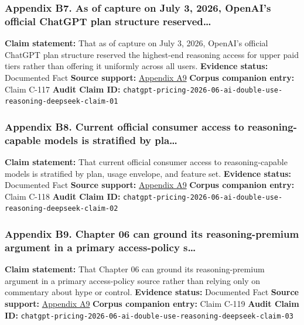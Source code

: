 \documentclass[
  american,
  11pt,
  letterpaper,
]{article}
\begin{document}
\subsubsection{Appendix B7. As of capture on July 3, 2026, OpenAI's
official ChatGPT plan structure
reserved\ldots{}}\label{appendix-b7-as-of-capture-on-july-3-2026-openai-s-official-chatgpt-plan-structure-reserved}

\textbf{Claim statement:} That as of capture on July 3, 2026, OpenAI's
official ChatGPT plan structure reserved the highest-end reasoning
access for upper paid tiers rather than offering it uniformly across all
users. \textbf{Evidence status:} Documented Fact \textbf{Source
support:}
\hyperref[appendix-a9-chatgpt-plans-free-go-plus-pro-business-and-enterprise]{Appendix
A9} \textbf{Corpus companion entry:} Claim C-117 \textbf{Audit Claim
ID:}
\texttt{chatgpt-pricing-2026-06-ai-double-use-reasoning-deepseek-claim-01}

\subsubsection{Appendix B8. Current official consumer access to
reasoning-capable models is stratified by
pla\ldots{}}\label{appendix-b8-current-official-consumer-access-to-reasoning-capable-models-is-stratified-by-pla}

\textbf{Claim statement:} That current official consumer access to
reasoning-capable models is stratified by plan, usage envelope, and
feature set. \textbf{Evidence status:} Documented Fact \textbf{Source
support:}
\hyperref[appendix-a9-chatgpt-plans-free-go-plus-pro-business-and-enterprise]{Appendix
A9} \textbf{Corpus companion entry:} Claim C-118 \textbf{Audit Claim
ID:}
\texttt{chatgpt-pricing-2026-06-ai-double-use-reasoning-deepseek-claim-02}

\subsubsection{Appendix B9. Chapter 06 can ground its reasoning-premium
argument in a primary access-policy
s\ldots{}}\label{appendix-b9-chapter-06-can-ground-its-reasoning-premium-argument-in-a-primary-access-policy-s}

\textbf{Claim statement:} That Chapter 06 can ground its
reasoning-premium argument in a primary access-policy source rather than
relying only on commentary about hype or control. \textbf{Evidence
status:} Documented Fact \textbf{Source support:}
\hyperref[appendix-a9-chatgpt-plans-free-go-plus-pro-business-and-enterprise]{Appendix
A9} \textbf{Corpus companion entry:} Claim C-119 \textbf{Audit Claim
ID:}
\texttt{chatgpt-pricing-2026-06-ai-double-use-reasoning-deepseek-claim-03}
\end{document}
